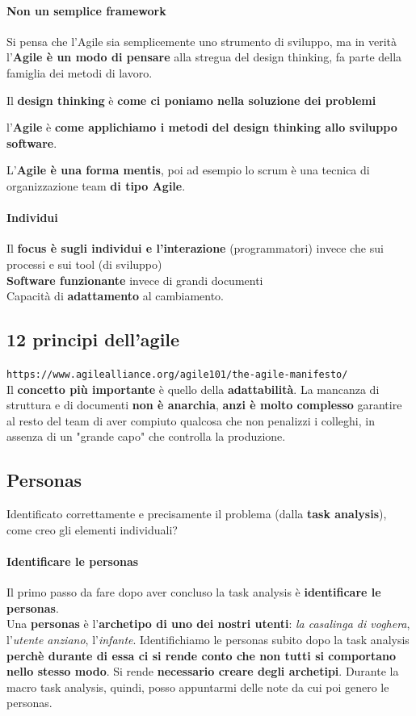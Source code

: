 \documentclass[10pt]{article}
\begin{document}
\paragraph{Non un semplice framework} Si pensa che l'Agile sia semplicemente uno strumento di sviluppo, ma in verità l'\textbf{Agile è un modo di pensare} alla stregua del design thinking, fa parte della famiglia dei metodi di lavoro.
\begin{list}{}{}
\item Il \textbf{design thinking} è \textbf{come ci poniamo nella soluzione dei problemi}
\item l'\textbf{Agile} è \textbf{come applichiamo i metodi del design thinking allo sviluppo software}.
\end{list}
L'\textbf{Agile è una forma mentis}, poi ad esempio lo scrum è una tecnica di organizzazione team \textbf{di tipo Agile}.
\paragraph{Individui} Il \textbf{focus è sugli individui e l'interazione} (programmatori) invece che sui processi e sui tool (di sviluppo)\\
\textbf{Software funzionante} invece di grandi documenti\\
Capacità di \textbf{adattamento} al cambiamento.
\subsection{12 principi dell'agile}
\texttt{https://www.agilealliance.org/agile101/the-agile-manifesto/}\\
Il \textbf{concetto più importante} è quello della \textbf{adattabilità}. La mancanza di struttura e di documenti \textbf{non è anarchia}, \textbf{anzi è molto complesso} garantire al resto del team di aver compiuto qualcosa che non penalizzi i colleghi, in assenza di un "grande capo" che controlla la produzione.
\subsection{Personas}
Identificato correttamente e precisamente il problema (dalla \textbf{task analysis}), come creo gli elementi individuali?
\paragraph{Identificare le personas} Il primo passo da fare dopo aver concluso la task analysis è \textbf{identificare le personas}.\\
Una \textbf{personas} è l'\textbf{archetipo di uno dei nostri utenti}: \textit{la casalinga di voghera}, l'\textit{utente anziano}, l'\textit{infante}. Identifichiamo le personas subito dopo la task analysis \textbf{perchè durante di essa ci si rende conto che non tutti si comportano nello stesso modo}. Si rende \textbf{necessario creare degli archetipi}. Durante la macro task analysis, quindi, posso appuntarmi delle note da cui poi genero le personas.
\end{document}
